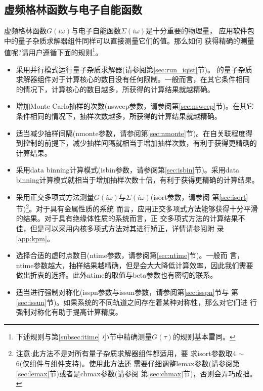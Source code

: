 \subsection{虚频格林函数与电子自能函数}
\label{subsec:ifreq}

虚频格林函数$G(i\omega)$与电子自能函数$\Sigma(i\omega)$是十分重要的物理量，
应用{\iqist}软件包中的量子杂质求解器组件同样可以直接测量它们的值。那么如何
获得精确的测量值呢?请用户遵循下面的规则\footnote{下述规则与第\ref{subsec:itime}
小节中精确测量$G(\tau)$的规则基本雷同。}。

\begin{itemize}
\item 采用并行模式运行量子杂质求解器(请参阅第\ref{sec:run_iqist}节)。{\iqist}
的量子杂质求解器组件对于计算核心的数目没有任何限制。一般而言，在其它条件相同
的情况下，计算核心的数目越多，所获得的计算结果就越精确。

\item 增加Monte Carlo抽样的次数(nsweep参数，请参阅第\ref{sec:nsweep}节)。在其它
条件相同的情况下，抽样次数越多，所获得的计算结果就越精确。

\item 适当减少抽样间隔(nmonte参数，请参阅第\ref{sec:nmonte}节)。在自关联程度得
到控制的前提下，减少抽样间隔就相当于增加抽样次数，有利于获得更精确的计算结果。

\item 采用data binning计算模式(isbin参数，请参阅第\ref{sec:isbin}节)。采用data
binning计算模式就相当于增加抽样次数十倍，有利于获得更精确的计算结果。

\item 采用正交多项式方法测量$G(i\omega)$与$\Sigma(i\omega)$(isort参数，请参阅
第\ref{sec:isort}节)\footnote{注意:此方法不是对所有量子杂质求解器组件都适用，要
求isort参数取4 $\sim$ 6(仅{\gardenia}组件与{\narcissus}组件支持)。使用此方法还
需要仔细调整lemax参数(请参阅第\ref{sec:lemax}节)或者是chmax参数(请参阅
第\ref{sec:chmax}节)，否则会弄巧成拙。}。对于具有金属性质的系统
而言，应用正交多项式方法能够获得十分平滑的结果。对于具有绝缘体性质的系统而言，正
交多项式方法的计算结果不佳，但是可以采用内核多项式方法对其进行矫正，详情请参阅附
录\ref{app:kpm}。

\item 选择合适的虚时点数目(ntime参数，请参阅第\ref{sec:ntime}节)。一般而
言，ntime参数越大，抽样结果越精确，但是会大大降低计算效率，因此我们需要
做出折衷的选择。此外ntime的取值与beta参数也有密切的联系。

\item 适当进行强制对称化(isspn参数与issun参数，请参阅第\ref{sec:isspn}节与
第\ref{sec:issun}节)。如果系统的不同轨道之间存在着某种对称性，那么对它们进
行强制对称化有助于提高计算精度。

\end{itemize}

